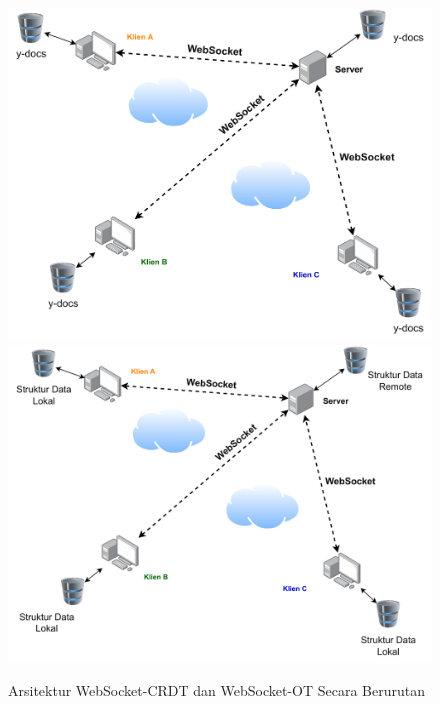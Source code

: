 \begin{figure}
    \centering
    \includegraphics[scale=0.42]{assets/skripsi/Arsitektur-WebSocket-CRDT}
    \includegraphics[scale=0.42]{assets/skripsi/Arsitektur-WebSocket-OT}
    \caption{Arsitektur WebSocket-CRDT dan WebSocket-OT Secara Berurutan}
\end{figure}

